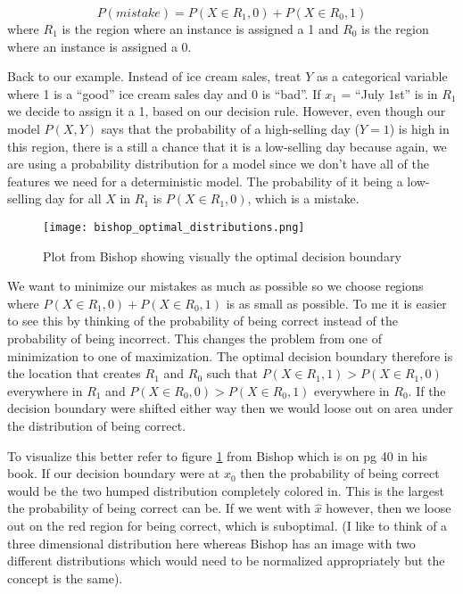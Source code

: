 \begin{equation}
P(mistake) = P(X\in R_1, 0) + P(X\in R_0, 1)
\end{equation}
where $R_1$ is the region where an instance is assigned a 1 and $R_0$ is the region where an instance is assigned a 0.

Back to our example. Instead of ice cream sales, treat $Y$ as a categorical variable where 1 is a ``good'' ice cream sales day and 0 is ``bad''.  If $x_1$ = ``July 1st'' is in $R_1$ we decide to assign it a 1, based on our decision rule. However, even though our model $P(X,Y)$ says that the probability of a high-selling day ($Y=1$) is high in this region, there is a still a chance that it is a low-selling day because again, we are using a probability distribution for a model since we don't have all of the features we need for a deterministic model. The probability of it being a low-selling day for all $X$ in $R_1$ is $P(X\in R_1, 0)$, which is a mistake.

 \begin{figure}[t] \label{fig:bishop_optimal_distributions}
\caption{Plot from Bishop showing visually the optimal decision boundary}
\centering
 \texttt{[image: bishop\_optimal\_distributions.png]}
 \end{figure}
 
We want to minimize our mistakes as much as possible so we choose regions where $P(X\in R_1, 0) + P(X\in R_0, 1)$ is as small as possible. To me it is easier to see this by thinking of the probability of being correct instead of the probability of being incorrect. This changes the problem from one of minimization to one of maximization. The optimal decision boundary therefore is the location that creates $R_1$ and $R_0$ such that $P(X\in R_1, 1) >  P(X\in R_1, 0)$ everywhere in $R_1$ and $P(X\in R_0, 0) >  P(X\in R_0, 1)$ everywhere in $R_0$. If the decision boundary were shifted either way then we would loose out on area under the distribution of being correct. 

To visualize this better refer to figure \ref{fig:bishop_optimal_distributions} from Bishop which is on pg 40 in his book. If our decision boundary were at $x_0$ then the probability of being correct would be the two humped distribution completely colored in. This is the largest the probability of being correct can be. If we went with $\hat{x}$ however, then we loose out on the red region for being correct, which is suboptimal. (I like to think of a three dimensional distribution here whereas Bishop has an image with two different distributions which would need to be normalized appropriately but the concept is the same).

